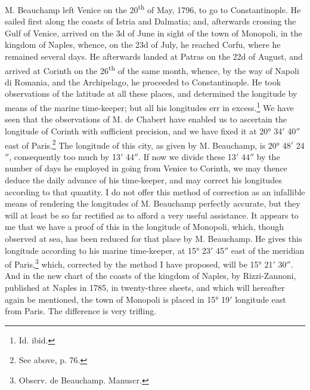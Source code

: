 \documentclass[a4paper, 11pt, oneside, polutonikogreek, english]{article}
\begin{document}
M. Beauchamp left Venice on the 20\textsuperscript{th} of May, 1796, to go to Constantinople. He sailed first along the coasts of Istria and Dalmatia; and, afterwards crossing the Gulf of Venice, arrived on the 3d of June in sight of the town of Monopoli, in the kingdom of Naples, whence, on the 23d of July, he reached Corfu, where he remained several days. He afterwards landed at Patras on the 22d of August, and arrived at Corinth on the 26\textsuperscript{th} of the same month, whence, by the way of Napoli di Romania, and the Archipelago, he proceeded to Constantinople. He took observations of the latitude at all these places, and determined the longitude by means of the marine time-keeper; but all his longitudes err in excess.\footnote{Id. ibid.} We have seen that the observations of M. de Chabert have enabled us to ascertain the longitude of Corinth with sufficient precision, and we have fixed it at 20° 34$'$ 40$''$ east of Paris.\footnote{See above, p. 76.} The longitude of this city, as given by M. Beauchamp, is 20° 48$'$ 24$''$, consequently too much by 13$'$ 44$''$. If now we divide these 13$'$ 44$''$ by the number of days he employed in going from Venice to Corinth, we may thence deduce the daily advance of his time-keeper, and may correct his longitudes according to that quantity. I do not offer this method of correction as an infallible means of rendering the longitudes of M. Beauchamp perfectly accurate, but they will at least be so far rectified as to afford a very useful assistance. It appears to me that we have a proof of this in the longitude of Monopoli, which, though observed at sea, has been reduced for that place by M. Beauchamp. He gives this longitude according to his marine time-keeper, at 15° 23$'$ 45$''$ east of the meridian of Paris,\footnote{Observ. de Beauchamp. Manuscr.} which, corrected by the method I have proposed, will be 15° 21$'$ 30$''$. And in the new chart of the coasts of the kingdom of Naples, by Rizzi-Zannoni, published at Naples in 1785, in twenty-three sheets, and which will hereafter again be mentioned, the town of Monopoli is placed in 15° 19$'$ longitude east from Paris. The difference is very trifling.
\end{document}
